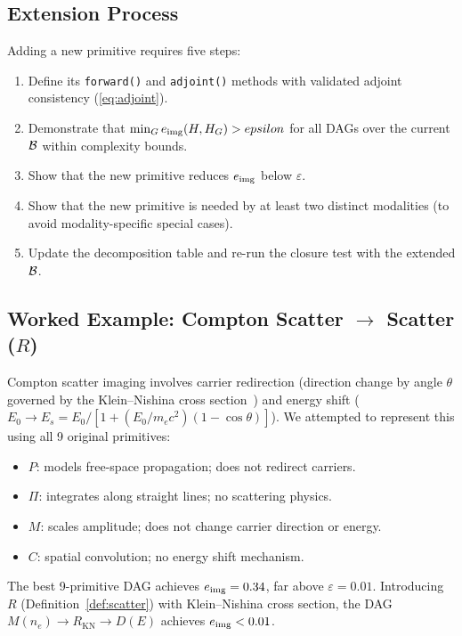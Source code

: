 \documentclass[11pt]{article}
\begin{document}
\subsection{Extension Process}

Adding a new primitive requires five steps:
\begin{enumerate}
  \item Define its \texttt{forward()} and \texttt{adjoint()} methods with validated adjoint consistency (\cref{eq:adjoint}).
  \item Demonstrate that $\min_G e_{\mathrm{img}}(H, H_{G}) > epsilon$ for all DAGs over the current $\mathcal{B}$ within complexity bounds.
  \item Show that the new primitive reduces $e_{\mathrm{img}}$ below $\varepsilon$.
  \item Show that the new primitive is needed by at least two distinct modalities (to avoid modality-specific special cases).
  \item Update the decomposition table and re-run the closure test with the extended $\mathcal{B}$.
\end{enumerate}

\subsection{Worked Example: Compton Scatter \texorpdfstring{$\to$}{->} Scatter (\texorpdfstring{$R$}{R})}

Compton scatter imaging involves carrier redirection (direction change by angle $\theta$ governed by the Klein--Nishina cross section~\cite{klein1929streuung}) and energy shift ($E_0 \to E_s = E_0/[1 + (E_0/m_e c^2)(1-\cos\theta)]$). We attempted to represent this using all 9 original primitives:

\begin{itemize}
  \item $P$: models free-space propagation; does not redirect carriers.
  \item $\Pi$: integrates along straight lines; no scattering physics.
  \item $M$: scales amplitude; does not change carrier direction or energy.
  \item $C$: spatial convolution; no energy shift mechanism.
\end{itemize}

The best 9-primitive DAG achieves $e_{\mathrm{img}} = 0.34$, far above $\varepsilon = 0.01$. Introducing $R$ (Definition~\ref{def:scatter}) with Klein--Nishina cross section, the DAG $M(n_e) \to R_{\mathrm{KN}} \to D(E)$ achieves $e_{\mathrm{img}} < 0.01$.
\end{document}
